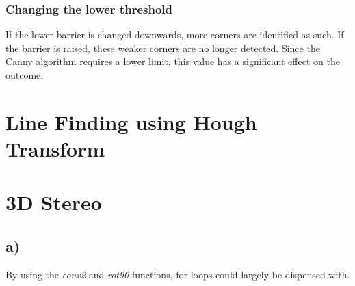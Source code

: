 \documentclass{article}
\begin{document}
	\subsubsection{Changing the lower threshold}If the lower barrier is changed downwards, more corners are identified as such. 
	If the barrier is raised, these weaker corners are no longer detected.
	Since the Canny algorithm requires a lower limit, this value has a significant effect on the outcome.
	\section{Line Finding using Hough Transform}
	\section{3D Stereo}
	\subsection{a)} 
	By using the \textit{conv2} and \textit{rot90} functions, for loops could largely be dispensed with. 
	
	
	
\end{document}

